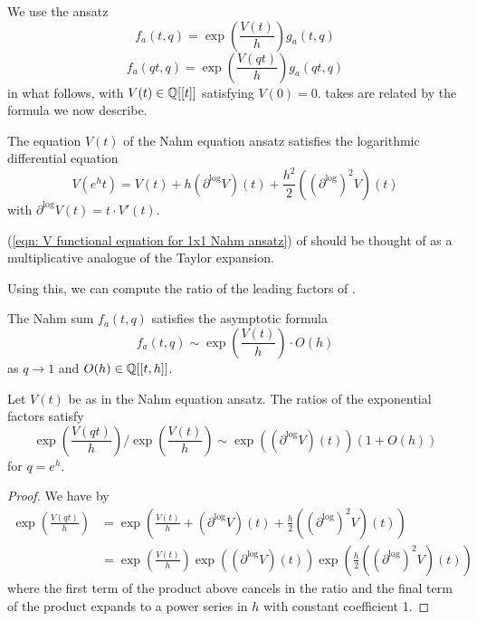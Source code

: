 We use the ansatz 
\begin{equation}\label{eqn: 1x1 Nahm sum ansatz}
    f_{a}(t,q)=\exp\left(\frac{V(t)}{h}\right)g_{a}(t,q)
\end{equation}
\begin{equation}\label{eqn: qt 1x1 Nahm sum ansatz}
    f_{a}(qt,q)=\exp\left(\frac{V(qt)}{h}\right)g_{a}(qt,q)
\end{equation}
in what follows, with $V(t)\in\mathbb{Q}[[t]]$ satisfying $V(0)=0$.  takes are related by the formula we now describe. 
\begin{proposition}\label{prop: V functional equation for 1x1 Nahm ansatz}
    The equation $V(t)$ of the Nahm equation ansatz satisfies the logarithmic differential equation 
    \begin{equation}\label{eqn: V functional equation for 1x1 Nahm ansatz}
        V(e^{h}t) = V(t) + h(\partial^{\log}V)(t)+\frac{h^{2}}{2}((\partial^{\log})^{2}V)(t)
    \end{equation}
    with $\partial^{\log}V(t)=t\cdot V'(t)$.
\end{proposition}
\begin{remark}
    (\ref{eqn: V functional equation for 1x1 Nahm ansatz}) of  should be thought of as a multiplicative analogue of the Taylor expansion. 
\end{remark}
Using this, we can compute the ratio of the leading factors of . 
\begin{proposition}\label{prop: asymptotic expansion of modifed 1x1 Nahm sum at 1}
    The Nahm sum $f_{a}(t,q)$ satisfies the asymptotic formula 
    \begin{equation}\label{eqn: asymptotic expansion of modified 1x1 Nahm sum at 1}
        f_{a}(t,q)\sim\exp\left(\frac{V(t)}{h}\right)\cdot O(h)
    \end{equation}
    as $q\to 1$ and $O(h)\in\mathbb{Q}[[t,h]]$. 
\end{proposition}
\begin{corollary}\label{corr: exponent ratio for 1x1 Nahm sum antsatz}
    Let $V(t)$ be as in the Nahm equation ansatz. The ratios of the exponential factors satisfy 
    $$\exp\left(\frac{V(qt)}{h}\right)/\exp\left(\frac{V(t)}{h}\right)\sim\exp((\partial^{\log}V)(t))(1+O(h))$$
    for $q=e^{h}$.  
\end{corollary}
\begin{proof}
    We have by 
    \begin{align*}
        \exp\left(\frac{V(qt)}{h}\right) &= \exp\left(\frac{V(t)}{h}+(\partial^{\log}V)(t)+\frac{h}{2}((\partial^{\log})^{2}V)(t)\right)\\
        &=\exp\left(\frac{V(t)}{h}\right)\exp\left((\partial^{\log}V)(t)\right)\exp\left(\frac{h}{2}((\partial^{\log})^{2}V)(t)\right)
    \end{align*}
    where the first term of the product above cancels in the ratio and the final term of the product expands to a power series in $h$ with constant coefficient 1. 
\end{proof}
